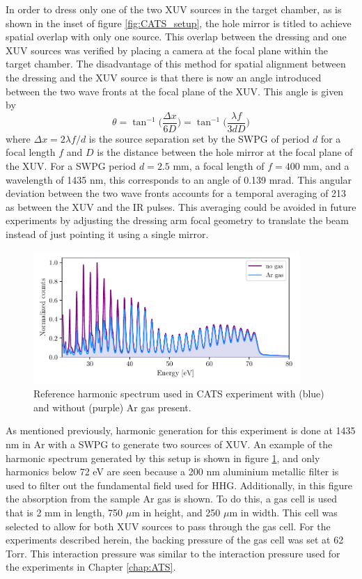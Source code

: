 In order to dress only one of the two XUV sources in the target chamber, as is shown in the inset of figure \ref{fig:CATS_setup}, the hole mirror is titled to achieve spatial overlap with only one source.  This overlap between the dressing and one XUV sources was verified by placing a camera at the focal plane within the target chamber.  The disadvantage of this method for spatial alignment between the dressing and the XUV source is that there is now an angle introduced between the two wave fronts at the focal plane of the XUV.  This angle is given by
\begin{equation}
	\theta = \tan^{-1}\bigg(\frac{\Delta x}{6 D}\bigg) = \tan^{-1}\bigg(\frac{\lambda f}{3 d D}\bigg)
\end{equation}
where $\Delta x = 2\lambda f /d$ is the source separation set by the SWPG of period $d$ for a focal length $f$ and $D$ is the distance between the hole mirror at the focal plane of the XUV. For a SWPG period $d=2.5$ mm, a focal length of $f=400$ mm, and a wavelength of 1435 nm, this corresponds to an angle of 0.139 mrad.  This angular deviation between the two wave fronts accounts for a temporal averaging of 213 as between the XUV and the IR pulses.  This averaging could be avoided in future experiments by adjusting the dressing arm focal geometry to translate the beam instead of just pointing it using a single mirror.

\begin{figure}
	\centering
	\includegraphics[width=0.9\textwidth]{figures/CATS/ref_harmonic_spectrum.pdf}
	\caption[Reference harmonic spectrum used in CATS experiment]{Reference harmonic spectrum used in CATS experiment with (blue) and without (purple) Ar gas present.}
	\label{fig:ref_harmonic_spectrum}
\end{figure}

As mentioned previously, harmonic generation for this experiment is done at 1435 nm in Ar with a SWPG to generate two sources of XUV.  An example of the harmonic spectrum generated by this setup is shown in figure \ref{fig:ref_harmonic_spectrum}, and only harmonics below 72 eV are seen because a 200 nm aluminium metallic filter is used to filter out the fundamental field used for HHG.  Additionally, in this figure the absorption from the sample Ar gas is shown. To do this, a gas cell is used that is 2 mm in length, 750 $\mu$m in height, and 250 $\mu$m in width.  This cell was selected to allow for both XUV sources to pass through the gas cell.  For the experiments described herein, the backing pressure of the gas cell was set at 62 Torr.  This interaction pressure was similar to the interaction pressure used for the experiments in Chapter \ref{chap:ATS}.

